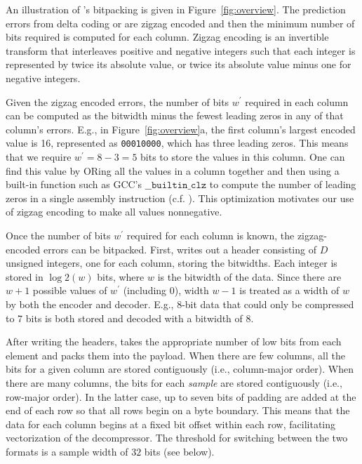 An illustration of \mine's bitpacking is given in Figure~\ref{fig:overview}. The prediction errors from delta coding or \fire are zigzag encoded \cite{zigzag} and then the minimum number of bits required is computed for each column. Zigzag encoding is an invertible transform that interleaves positive and negative integers such that each integer is represented by twice its absolute value, or twice its absolute value minus one for negative integers. %

Given the zigzag encoded errors, the number of bits $w^\prime$ required in each column can be computed as the bitwidth minus the fewest leading zeros in any of that column's errors. E.g., in Figure~\ref{fig:overview}a, the first column's largest encoded value is 16, represented as \texttt{00010000}, which has three leading zeros. This means that we require $w^\prime = 8 - 3 = 5$ bits to store the values in this column. One can find this value by ORing all the values in a column together and then using a built-in function such as GCC's $\texttt{\_\_builtin\_clz}$ to compute the number of leading zeros in a single assembly instruction (c.f. \cite{fastpfor}). This optimization motivates our use of zigzag encoding to make all values nonnegative.

Once the number of bits $w^\prime$ required for each column is known, the zigzag-encoded errors can be bitpacked. First, \minesp writes out a header consisting of $D$ unsigned integers, one for each column, storing the bitwidths. Each integer is stored in $\log2(w)$ bits, where $w$ is the bitwidth of the data. Since there are $w+1$ possible values of $w^\prime$ (including 0), width $w-1$ is treated as a width of $w$ by both the encoder and decoder. E.g., 8-bit data that could only be compressed to 7 bits is both stored and decoded with a bitwidth of 8.

After writing the headers, \minesp takes the appropriate number of low bits from each element and packs them into the payload. When there are few columns, all the bits for a given column are stored contiguously (i.e., column-major order). When there are many columns, the bits for each \textit{sample} are stored contiguously (i.e., row-major order). In the latter case, up to seven bits of padding are added at the end of each row so that all rows begin on a byte boundary. This means that the data for each column begins at a fixed bit offset within each row, facilitating vectorization of the decompressor. The threshold for switching between the two formats is a sample width of $32$ bits (see below).

